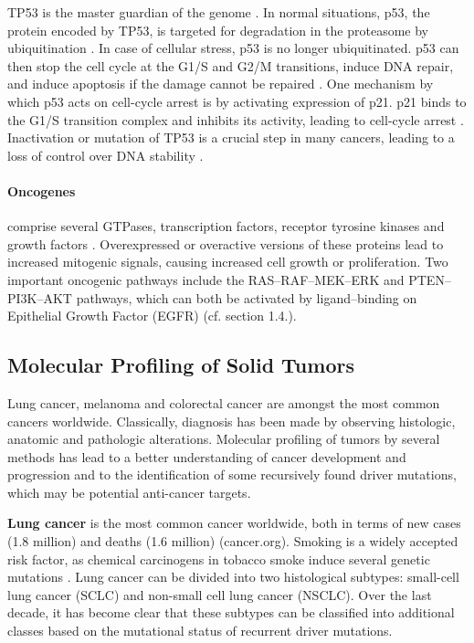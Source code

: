 {{{    TP53 is the master guardian of the genome {\cite{tp53_1}}. In normal
    situations, p53, the protein encoded by TP53, is targeted for degradation
    in the proteasome by ubiquitination {\cite{tp53_2}}. In case of cellular
    stress, p53 is no longer ubiquitinated. p53 can then stop the cell cycle at
    the G1/S and G2/M transitions, induce DNA repair, and induce apoptosis if
    the damage cannot be repaired {\cite{tp53_3}}. One mechanism by which p53
    acts on cell-cycle arrest is by activating expression of p21. p21 binds to
    the G1/S transition complex and inhibits its activity, leading to
    cell-cycle arrest {\cite{tp53_3}}. Inactivation or mutation of TP53 is a
    crucial step in many cancers, leading to a loss of control over DNA
    stability {\cite{tp53_4}}.

    \paragraph{Oncogenes} comprise several GTPases, transcription factors,
    receptor tyrosine kinases and growth factors {\cite{oncogenes}}.
    Overexpressed or overactive versions of these proteins lead to increased
    mitogenic signals, causing increased cell growth or proliferation. Two
    important oncogenic pathways include the RAS--RAF--MEK--ERK and
    PTEN--PI3K--AKT pathways, which can both be activated by ligand--binding on
    Epithelial Growth Factor (EGFR) (cf. section 1.4.).

  \subsection{Molecular Profiling of Solid Tumors}

    Lung cancer, melanoma and colorectal cancer are amongst the most common
    cancers worldwide. Classically, diagnosis has been made by observing
    histologic, anatomic and pathologic alterations. Molecular
    profiling of tumors by several methods has lead to a better understanding
    of cancer development and progression and to the identification of some
    recursively found driver mutations, which may be potential anti-cancer
    targets.

    \textbf{Lung cancer} is the most common cancer worldwide, both in terms of
    new cases (1.8 million) and deaths (1.6 million) (cancer.org). Smoking is a
    widely accepted risk factor, as chemical carcinogens in tobacco smoke
    induce several genetic mutations {\cite{smoking_cancer}}. Lung cancer can
    be divided into two histological subtypes: small-cell lung cancer (SCLC)
    and non-small cell lung cancer (NSCLC). Over the last decade, it has become
    clear that these subtypes can be classified into  additional classes based
    on the mutational status of recurrent driver mutations.

}}}
